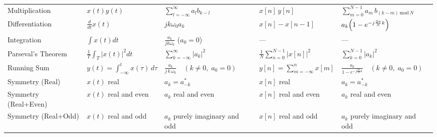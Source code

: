 \documentclass{article}
\begin{document}
\begin{multicols}{2}
\begin{table*}[ht]
\begin{tabular}{@{}lllll@{}}
            Multiplication       & $x(t) y(t)$                                           & $\sum_{l=-\infty}^{\infty} a_l b_{k - l}$                       & $x[n]\,y[n]$                                  & $\sum_{m=0}^{N-1} a_m\,b_{(k-m)\,\mathrm{mod}\,N}$                         \\ [1mm]
            Differentiation      & $\frac{d}{dt} x(t)$                                   & $j k \omega_0 a_k$                                              & $x[n]-x[n-1]$                                 & $a_k\Bigl(1-e^{-j\frac{2\pi}{N} k}\Bigr)$                                  \\ [1mm]
            Integration          & $\int x(t) dt$                                        & $\frac{a_k}{j k \omega_0}$ ($a_0 = 0$)                          & ---                                           & ---                                                                        \\ [1mm]
            Parseval's Theorem   & $\frac{1}{T} \int_T |x(t)|^2 dt$                      & $\sum_{k=-\infty}^{\infty} |a_k|^2$                             & $\frac{1}{N}\sum_{n=0}^{N-1}|x[n]|^2$         & $\sum_{k=0}^{N-1}|a_k|^2$                                                  \\ [1mm]
            Running Sum          & $\displaystyle y(t)=\int_{-\infty}^{t}x(\tau)\,d\tau$ & $\displaystyle \frac{a_k}{j\,k\,\omega_0}\quad(k\neq0,\;a_0=0)$ & $\displaystyle y[n]=\sum_{m=-\infty}^{n}x[m]$ & $\displaystyle \frac{a_k}{1 - e^{-j\frac{2\pi}{N}k}}\quad(k\neq0,\;a_0=0)$ \\ [1mm]
            Symmetry (Real)      & $x(t)$ real                                           & $a_k = a_{-k}^*$                                                & $x[n]$ real                                   & $a_k = a_{-k}^*$                                                           \\ [1mm]
            Symmetry (Real+Even) & $x(t)$ real and even                                  & $a_k$ real and even                                             & $x[n]$ real and even                          & $a_k$ real and even                                                        \\ [1mm]
            Symmetry (Real+Odd)  & $x(t)$ real and odd                                   & $a_k$ purely imaginary and odd                                  & $x[n]$ real and odd                           & $a_k$ purely imaginary and odd                                             \\
            \bottomrule
        \end{tabular}
    \end{table*}

\end{multicols}
\end{document}
